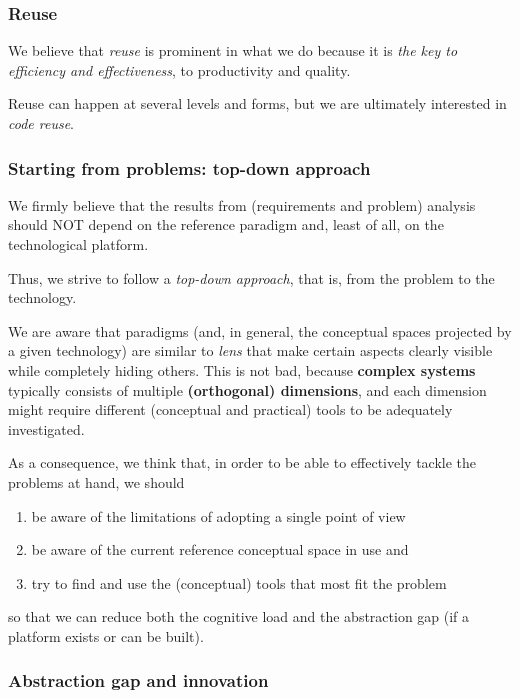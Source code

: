 \documentclass[11pt]{article}
\begin{document}
\subsubsection*{Reuse}

We believe that \emph{reuse} is prominent in what we do because it is 
 \emph{the key to efficiency and effectiveness}, to productivity and quality.

Reuse can happen at several levels and forms, but we are ultimately interested
in \emph{code reuse}.


\subsubsection*{Starting from problems: top-down approach}

We firmly believe that the results from (requirements and problem) analysis
should NOT depend on the reference paradigm and, least of all, on the technological platform. 

Thus, we strive to follow a \emph{top-down approach}, that is, from the problem
to the technology.

 We are aware that paradigms (and, in general, the conceptual spaces
 projected by a given technology) are similar to \emph{lens} that make certain
 aspects clearly visible while completely hiding others. This is not bad,
 because \textbf{complex systems} typically consists of multiple
 \textbf{(orthogonal) dimensions}, and each dimension might require different 
 (conceptual and practical) tools to be adequately investigated.
 
 As a consequence, we think that, in order to be able to effectively tackle the
 problems at hand, we should
 
 \begin{enumerate}
   \item be aware of the limitations of adopting a single point of view
   \item be aware of the current reference conceptual space in use and 
   \item try to find and use the (conceptual) tools that most fit the problem
 \end{enumerate}
 
 so that we can reduce both the cognitive load and the abstraction gap (if a
 platform exists or can be built).


\subsubsection*{Abstraction gap and innovation}
\end{document}
